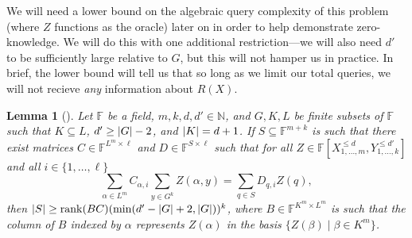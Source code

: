 \documentclass[english,12pt]{reedthesis}
\theoremstyle{plain}
\newtheorem{lemma}[lemma]{Lemma}
\theoremstyle{definition}
\theoremstyle{remark}
\DeclareMathOperator{\rk}{rank}
\DeclarePairedDelimiter{\abs}{\lvert}{\rvert}
\begin{document}
We will need a lower bound on the algebraic query complexity of this problem
(where $Z$ functions as the oracle) later on in order to help demonstrate
zero-knowledge. We will do this with one additional restriction---we will also
need $d'$ to be sufficiently large relative to $G$, but this will not hamper us
in practice. In brief, the lower bound will tell us that so long as we limit
our total queries, we will not recieve \emph{any} information about $R(X)$.


\begin{lemma}[{\cite[Lemma 12.1]{CFGS22}}]
  Let $\mathbb{F}$ be a field, $m, k, d, d' \in \mathbb{N}$, and $G, K, L$ be finite
  subsets of $\mathbb{F}$ such that $K \subseteq L$, $d' \ge \abs{G} - 2$, and
  $\abs{K} = d + 1$. If $S \subseteq \mathbb{F}^{m+k}$ is such that there exist matrices
  $C \in \mathbb{F}^{L^{m} \times \ell}$ and $D \in \mathbb{F}^{S \times \ell}$ such that for
  all $Z \in \mathbb{F}[X_{1, \ldots, m}^{\le d}, Y_{1, \ldots, k}^{\le d'}]$ and all
  $i \in \{1, \ldots, \ell\}$
  \begin{equation}\label{eqn:polynomial-sum}
    \sum_{\alpha \in L^{m}}C_{\alpha,i}\sum_{y \in G^{k}}Z(\alpha, y) = \sum_{q \in S}D_{q,i}Z(q),
  \end{equation}
  then $\abs{S} \ge \rk(BC)(\min(d' - \abs{G} + 2, \abs{G}))^{k}$, where
  $B \in \mathbb{F}^{K^{m} \times L^{m}}$ is such that the column of $B$ indexed by $\alpha$
  represents $Z(\alpha)$ in the basis $\{Z(\beta) \mid \beta \in K^{m}\}$.
\end{lemma}
\end{document}
